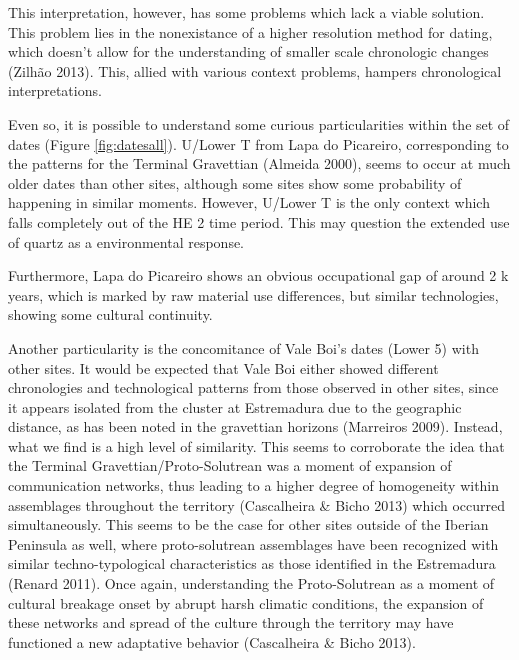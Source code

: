 \documentclass[12pt,twoside]{reedthesis}
\begin{document}
This interpretation, however, has some problems which lack a viable solution. This problem lies in the nonexistance of a higher resolution method for dating, which doesn't allow for the understanding of smaller scale chronologic changes (Zilhão 2013). This, allied with various context problems, hampers chronological interpretations.

Even so, it is possible to understand some curious particularities within the set of dates (Figure \ref{fig:datesall}). U/Lower T from Lapa do Picareiro, corresponding to the patterns for the Terminal Gravettian (Almeida 2000), seems to occur at much older dates than other sites, although some sites show some probability of happening in similar moments. However, U/Lower T is the only context which falls completely out of the HE 2 time period. This may question the extended use of quartz as a environmental response.

Furthermore, Lapa do Picareiro shows an obvious occupational gap of around 2 k years, which is marked by raw material use differences, but similar technologies, showing some cultural continuity.

Another particularity is the concomitance of Vale Boi's dates (Lower 5) with other sites. It would be expected that Vale Boi either showed different chronologies and technological patterns from those observed in other sites, since it appears isolated from the cluster at Estremadura due to the geographic distance, as has been noted in the gravettian horizons (Marreiros 2009). Instead, what we find is a high level of similarity. This seems to corroborate the idea that the Terminal Gravettian/Proto-Solutrean was a moment of expansion of communication networks, thus leading to a higher degree of homogeneity within assemblages throughout the territory (Cascalheira \& Bicho 2013) which occurred simultaneously. This seems to be the case for other sites outside of the Iberian Peninsula as well, where proto-solutrean assemblages have been recognized with similar techno-typological characteristics as those identified in the Estremadura (Renard 2011). Once again, understanding the Proto-Solutrean as a moment of cultural breakage onset by abrupt harsh climatic conditions, the expansion of these networks and spread of the culture through the territory may have functioned a new adaptative behavior (Cascalheira \& Bicho 2013).
\end{document}
